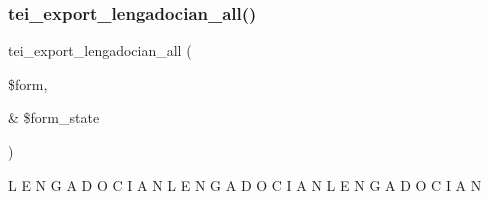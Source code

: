\subsubsection{\texorpdfstring{tei\+\_\+export\+\_\+lengadocian\+\_\+all()}{tei\_export\_lengadocian\_all()}}
{\footnotesize\ttfamily tei\+\_\+export\+\_\+lengadocian\+\_\+all (\begin{DoxyParamCaption}\item[{}]{\$form,  }\item[{\&}]{\$form\+\_\+state }\end{DoxyParamCaption})}

L E N G A D O C I A N L E N G A D O C I A N L E N G A D O C I A N 